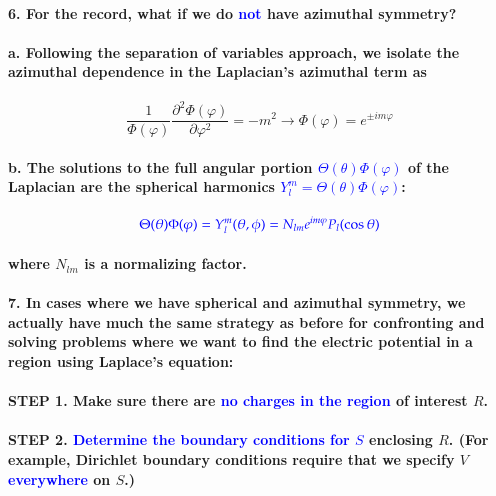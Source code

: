 \documentclass{article}
\begin{document}
\paragraph{6. For the record, what if we do \textcolor{blue}{not} have azimuthal symmetry?}
\paragraph{\indent a. Following the separation of variables approach, we isolate the azimuthal dependence in the Laplacian's azimuthal term as}
\begin{equation*}
    \frac{1}{\Phi(\varphi)}\frac{\partial^2\Phi(\varphi)}{\partial\varphi^2}=-m^2\rightarrow \Phi(\varphi)=e^{\pm im\varphi}
\end{equation*}
\paragraph{\indent b. The solutions to the full angular portion \textcolor{blue}{$\Theta(\theta)\Phi(\varphi)$} of the Laplacian are the spherical harmonics \textcolor{blue}{$Y_l^m=\Theta(\theta)\Phi(\varphi)$}:}
\begin{equation*}
    \textcolor{blue}{\Theta(\theta)\Phi(\varphi)=Y_l^m(\theta,\phi)=N_{lm}e^{im\varphi}P_l(\cos\theta)}
\end{equation*}
\paragraph{where $N_{lm}$ is a normalizing factor.}
\paragraph{7. In cases where we have spherical and azimuthal symmetry, we actually have much the same strategy as before for confronting and solving problems where we want to find the electric potential in a region using Laplace's equation:}
\paragraph{STEP 1. Make sure there are \textcolor{blue}{no charges in the region} of interest $R$.}
\paragraph{STEP 2. \textcolor{blue}{Determine the boundary conditions for $S$} enclosing $R$. (For example, Dirichlet boundary conditions require that we specify $V$ \textcolor{blue}{everywhere} on $S$.)}
\end{document}
